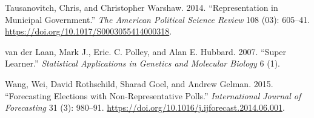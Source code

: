 \documentclass[
]{article}
\newlength{\cslhangindent}
\newlength{\cslentryspacingunit} %
\newenvironment{CSLReferences}[2] %
 {%
  \setlength{\parindent}{0pt}
  \ifodd #1
  \let\oldpar\par
  \def\par{\hangindent=\cslhangindent\oldpar}
  \fi
  \setlength{\parskip}{#2\cslentryspacingunit}
 }%
 {}
\begin{document}
\begin{CSLReferences}{1}{0}
\leavevmode{}%
Tausanovitch, Chris, and Christopher Warshaw. 2014. {``Representation in
Municipal Government.''} \emph{The American Political Science Review}
108 (03): 605--41. \url{https://doi.org/10.1017/S0003055414000318}.

\leavevmode{}%
van der Laan, Mark J., Eric. C. Polley, and Alan E. Hubbard. 2007.
{``Super Learner.''} \emph{Statistical Applications in Genetics and
Molecular Biology} 6 (1).

\leavevmode{}%
Wang, Wei, David Rothschild, Sharad Goel, and Andrew Gelman. 2015.
{``Forecasting Elections with Non-Representative Polls.''}
\emph{International Journal of Forecasting} 31 (3): 980--91.
\url{https://doi.org/10.1016/j.ijforecast.2014.06.001}.

\end{CSLReferences}
\end{document}
